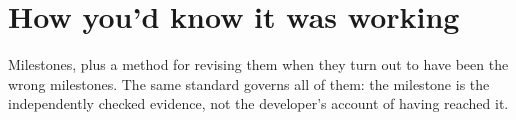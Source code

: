 \section{How you'd know it was working}
\label{sec:29.1}
Milestones, plus a method for revising them when they turn out to have been the wrong milestones. The same standard governs all of them: the milestone is the independently checked evidence, not the developer's account of having reached it.
